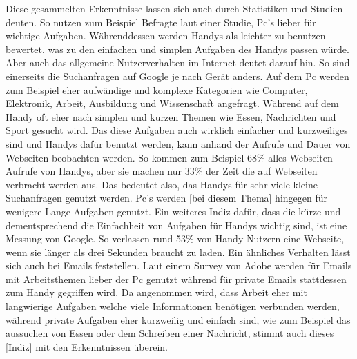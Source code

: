 \myNewSection
Diese gesammelten Erkenntnisse lassen sich auch durch Statistiken und Studien deuten. %
So nutzen zum Beispiel Befragte laut einer Studie, Pc's lieber für wichtige Aufgaben. Währenddessen werden Handys als leichter zu benutzen bewertet, was zu den einfachen und simplen Aufgaben des Handys passen würde\cite{pcVsphone_easyUseVsImportantTask}.\newline%
Aber auch das allgemeine Nutzerverhalten im Internet deutet darauf hin.
	So sind einerseits die Suchanfragen auf Google je nach Gerät anders. Auf dem Pc werden zum Beispiel eher aufwändige und komplexe Kategorien wie Computer, Elektronik, Arbeit, Ausbildung und Wissenschaft angefragt. Während auf dem Handy oft eher nach simplen und kurzen Themen wie Essen, Nachrichten und Sport gesucht wird\cite{pcVsphone_onWebsites_DevicesDistrubition_TimeSpent_Bouncrate_PageViews_Categories}.\newline%
		Das diese Aufgaben auch wirklich einfacher und kurzweiliges sind und Handys dafür benutzt werden, kann anhand der Aufrufe und Dauer von Webseiten beobachten werden. So kommen zum Beispiel 68\% alles Webseiten-Aufrufe von Handys, aber sie machen nur 33\% der Zeit die auf Webseiten verbracht werden aus\cite{pcVsphone_onWebsites_DevicesDistrubition_TimeSpent_Bouncrate_PageViews_Categories}. Das bedeutet also, das Handys für sehr viele kleine Suchanfragen genutzt werden. Pc's werden [bei diesem Thema] hingegen für wenigere Lange Aufgaben genutzt.\newline%
		Ein weiteres Indiz dafür, dass die kürze und dementsprechend die Einfachheit von Aufgaben für Handys wichtig sind, ist eine Messung von Google. So verlassen rund 53\% von Handy Nutzern eine Webseite, wenn sie länger als drei Sekunden braucht zu laden\cite{pcVsphone_threeSeconds}.\newline%
		Ein ähnliches Verhalten lässt sich auch bei Emails feststellen. Laut einem Survey von Adobe werden für Emails mit Arbeitsthemen lieber der Pc genutzt während für private Emails stattdessen zum Handy gegriffen wird\cite{pcVsphone_personalEmailsVsWorkEmails}. Da angenommen wird, dass Arbeit eher mit langwierige Aufgaben welche viele Informationen benötigen verbunden werden, während private Aufgaben eher kurzweilig und einfach sind, wie zum Beispiel das aussuchen von Essen oder dem Schreiben einer Nachricht, stimmt auch dieses [Indiz] mit den Erkenntnissen überein.

